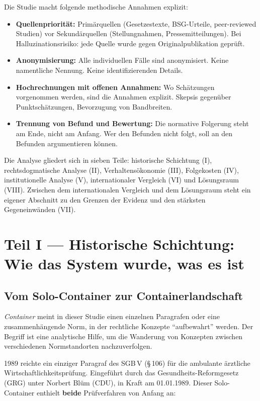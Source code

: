 \documentclass{umbruch-position}
\begin{document}
Die Studie macht folgende methodische Annahmen explizit:

\begin{itemize}[nosep]
  \item \textbf{Quellenpriorität:} Primärquellen (Gesetzestexte, BSG-Urteile, peer-reviewed Studien) vor Sekundärquellen (Stellungnahmen, Pressemitteilungen). Bei Halluzinationsrisiko: jede Quelle wurde gegen Originalpublikation geprüft.
  \item \textbf{Anonymisierung:} Alle individuellen Fälle sind anonymisiert. Keine namentliche Nennung. Keine identifizierenden Details.
  \item \textbf{Hochrechnungen mit offenen Annahmen:} Wo Schätzungen vorgenommen werden, sind die Annahmen explizit. Skepsis gegenüber Punktschätzungen, Bevorzugung von Bandbreiten.
  \item \textbf{Trennung von Befund und Bewertung:} Die normative Folgerung steht am Ende, nicht am Anfang. Wer den Befunden nicht folgt, soll an den Befunden argumentieren können.
\end{itemize}

\noindent Die Analyse gliedert sich in sieben Teile: historische Schichtung (I), rechtsdogmatische Analyse (II), Verhaltensökonomie (III), Folgekosten (IV), institutionelle Analyse (V), internationaler Vergleich (VI) und Lösungsraum (VIII). Zwischen dem internationalen Vergleich und dem Lösungsraum steht ein eigener Abschnitt zu den Grenzen der Evidenz und den stärksten Gegeneinwänden (VII).

\section{Teil I --- Historische Schichtung: Wie das System wurde, was es ist}

\subsection{Vom Solo-Container zur Containerlandschaft}

\textit{Container} meint in dieser Studie einen einzelnen Paragrafen oder eine zusammenhängende Norm, in der rechtliche Konzepte ``aufbewahrt'' werden. Der Begriff ist eine analytische Hilfe, um die Wanderung von Konzepten zwischen verschiedenen Normstandorten nachzuverfolgen.

1989 reichte ein einziger Paragraf des SGB\,V (\S\,106) für die ambulante ärztliche Wirtschaftlichkeitsprüfung. Eingeführt durch das Gesundheits-Reformgesetz (GRG) unter Norbert Blüm (CDU), in Kraft am 01.01.1989. Dieser Solo-Container enthielt \textbf{beide} Prüfverfahren von Anfang an:
\end{document}
